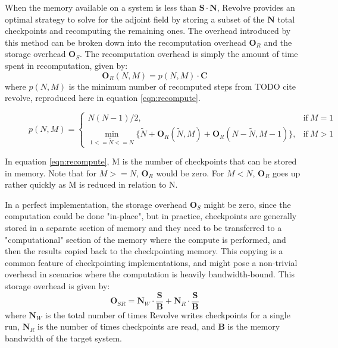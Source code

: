 \documentclass[conference]{IEEEtran}
\begin{document}
When the memory available on a system is less than $\mathbf{S} \cdot \mathbf{N}$, Revolve provides
an optimal strategy to solve for the adjoint field by storing a subset of the $\mathbf{N}$ total checkpoints
and recomputing the remaining ones. The overhead introduced by this method can be broken down into
the recomputation overhead $\mathbf{O}_R$ and the storage overhead $\mathbf{O}_S$. The recomputation
overhead is simply the amount of time spent in recomputation, given by:
\begin{equation}
\mathbf{O}_R(N, M) = p(N, M) \cdot \mathbf{C}
\end{equation}
where $p(N, M)$ is the minimum number of recomputed steps from TODO cite revolve, reproduced
here in equation \ref{eqn:recompute}.
\begin{figure}
\begin{equation}
p(N, M) = \begin{cases}
      N(N-1) /2, & \text{if}\ M=1 \\
      \min\limits_{1<=\widetilde{N}<=N} \{\widetilde{N} + \mathbf{O}_R(\widetilde{N}, M) + \mathbf{O}_R(N-\widetilde{N}, M-1)\}, & \text{if}\ M>1
    \end{cases}
    \label{eqn:recompute}
\end{equation}
\end{figure}
In equation \ref{eqn:recompute}, M is the number of checkpoints that can be stored in memory. Note that for $M >=N$, $\mathbf{O}_R$
would be zero. For $M < N$, $\mathbf{O}_R$ goes up rather quickly as M is reduced in relation to N. 

In a perfect implementation, the storage overhead $\mathbf{O}_S$ might be zero, since the computation could
be done "in-place", but in practice, checkpoints are generally stored in a separate section of memory and they
need to be transferred to a "computational" section of the memory where the compute is performed, and then
the results copied back to the checkpointing memory. This copying is a common feature of checkpointing
implementations, and might pose a non-trivial overhead in scenarios where the computation is heavily bandwidth-bound. 
This storage overhead is given by:
\begin{equation}
\mathbf{O}_{SR} = \mathbf{N}_W \cdot \frac{\mathbf{S}}{\mathbf{B}} + \mathbf{N}_R \cdot \frac{\mathbf{S}}{\mathbf{B}}
\label{eqn:storage}
\end{equation}
where $\mathbf{N}_W$ is the total number of times Revolve writes checkpoints for a single run, $ \mathbf{N}_R$ 
is the number of times checkpoints are read, and $\mathbf{B}$ is the memory bandwidth of the target system. 
\end{document}
